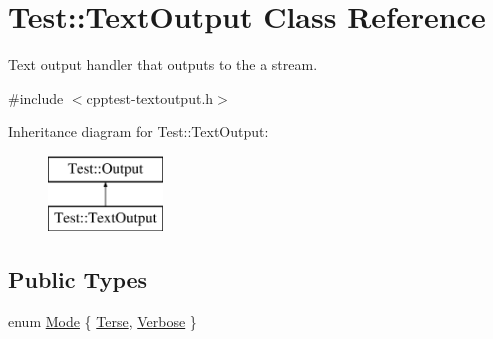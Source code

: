\hypertarget{class_test_1_1_text_output}{}\section{Test\+:\+:Text\+Output Class Reference}
\label{class_test_1_1_text_output}


Text output handler that outputs to the a stream.  




{\ttfamily \#include $<$cpptest-\/textoutput.\+h$>$}

Inheritance diagram for Test\+:\+:Text\+Output\+:\begin{figure}[H]
\begin{center}
\leavevmode
\includegraphics[height=2.000000cm]{class_test_1_1_text_output}
\end{center}
\end{figure}
\subsection*{Public Types}
\begin{DoxyCompactItemize}
\item 
enum \hyperlink{class_test_1_1_text_output_ae7b22c9458e6c566996bf4517c73feb1}{Mode} \{ \hyperlink{class_test_1_1_text_output_ae7b22c9458e6c566996bf4517c73feb1ae63930203459836dfc6e0939f92a9fb2}{Terse}, 
\hyperlink{class_test_1_1_text_output_ae7b22c9458e6c566996bf4517c73feb1a85dd6e42f6261a23fd504201f5cc2792}{Verbose}
 \}
\end{DoxyCompactItemize}
